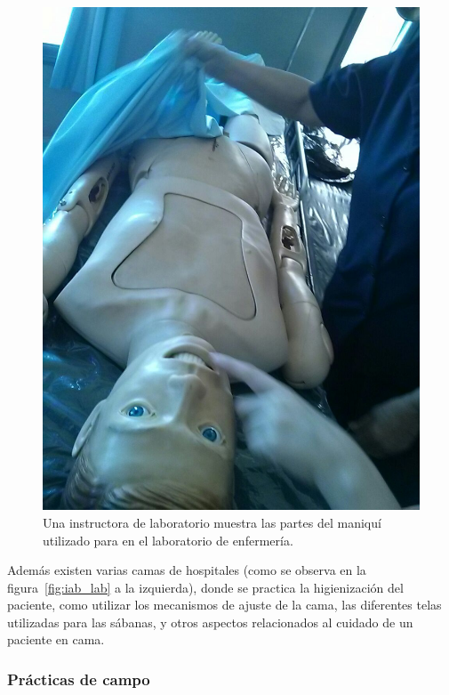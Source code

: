 \begin{figure}[h!t] 
\centering 
\includegraphics[scale=0.2,natwidth=400,natheight=200]{problema/iab_sala_3.jpg}
\caption{Una instructora de laboratorio muestra las partes del maniquí utilizado
    para en el laboratorio de enfermería.}
\label{fig:iab_mani}
\end{figure}

Además existen varias camas de hospitales (como se observa en la
figura~\ref{fig:iab_lab} a la izquierda), donde se practica la higienización del
paciente, como utilizar los mecanismos de ajuste de la cama, las diferentes
telas utilizadas para las sábanas, y otros aspectos relacionados al cuidado de
un paciente en cama.


\subsubsection{Prácticas de campo}
\label{sec:practica_hos}

